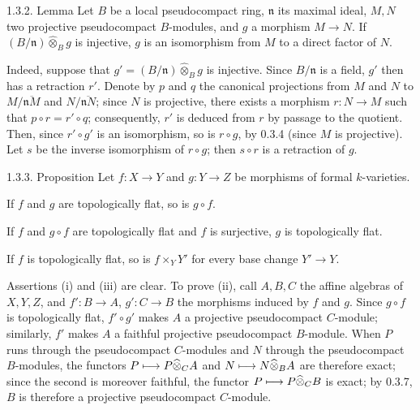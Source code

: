 \begin{enonce}{1.3.2. Lemma}{}\label{VIIB.1.3.2}
Let $B$ be a local pseudocompact ring, $\mathfrak n$ its maximal ideal, $M,N$ two projective pseudocompact $B$-modules, and $g$ a morphism $M\to N$. If $(B/\mathfrak n)\widehat\otimes_B g$ is injective, $g$ is an isomorphism from $M$ to a direct factor of $N$.
\end{enonce}
Indeed, suppose that $g'=(B/\mathfrak n)\widehat\otimes_B g$ is injective. Since $B/\mathfrak n$ is a field, $g'$ then has a retraction $r'$. Denote by $p$ and $q$ the canonical projections from $M$ and $N$ to $M/\overline{\mathfrak nM}$ and $N/\overline{\mathfrak nN}$; since $N$ is projective, there exists a morphism $r:N\to M$ such that $p\circ r=r'\circ q$; consequently, $r'$ is deduced from $r$ by passage to the quotient. Then, since $r'\circ g'$ is an isomorphism, so is $r\circ g$, by 0.3.4 (since $M$ is projective). Let $s$ be the inverse isomorphism of $r\circ g$; then $s\circ r$ is a retraction of $g$.

\begin{enonce}{1.3.3. Proposition}{}\label{VIIB.1.3.3}
Let $f:X\to Y$ and $g:Y\to Z$ be morphisms of formal $k$-varieties.
\begin{enumeratei}
\item If $f$ and $g$ are topologically flat, so is $g\circ f$.
\item If $f$ and $g\circ f$ are topologically flat and $f$ is surjective, $g$ is topologically flat.
\item If $f$ is topologically flat, so is $f\times_Y Y'$ for every base change $Y'\to Y$.
\end{enumeratei}
\end{enonce}
Assertions (i) and (iii) are clear. To prove (ii), call $A,B,C$ the affine algebras of $X,Y,Z$, and $f':B\to A$, $g':C\to B$ the morphisms induced by $f$ and $g$. Since $g\circ f$ is topologically flat, $f'\circ g'$ makes $A$ a projective pseudocompact $C$-module; similarly, $f'$ makes $A$ a faithful projective pseudocompact $B$-module. When $P$ runs through the pseudocompact $C$-modules and $N$ through the pseudocompact $B$-modules, the functors $P\longmapsto P\widehat\otimes_C A$ and $N\longmapsto N\widehat\otimes_B A$ are therefore exact; since the second is moreover faithful, the functor $P\longmapsto P\widehat\otimes_C B$ is exact; by 0.3.7, $B$ is therefore a projective pseudocompact $C$-module.

